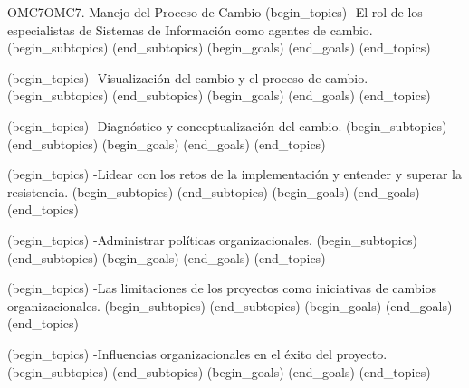 \begin{BKL2}{OMC7}{OMC7. Manejo del Proceso de Cambio}
(begin_topics)
-El rol de los especialistas de Sistemas de Información como agentes de cambio.
(begin_subtopics)
(end_subtopics)
(begin_goals)
(end_goals)
(end_topics)

(begin_topics)
-Visualización del cambio y el proceso de cambio.
(begin_subtopics)
(end_subtopics)
(begin_goals)
(end_goals)
(end_topics)

(begin_topics)
-Diagnóstico y conceptualización del cambio.
(begin_subtopics)
(end_subtopics)
(begin_goals)
(end_goals)
(end_topics)

(begin_topics)
-Lidear con los retos de la implementación y entender y superar la resistencia.
(begin_subtopics)
(end_subtopics)
(begin_goals)
(end_goals)
(end_topics)

(begin_topics)
-Administrar políticas organizacionales.
(begin_subtopics)
(end_subtopics)
(begin_goals)
(end_goals)
(end_topics)

(begin_topics)
-Las limitaciones de los proyectos como iniciativas de cambios organizacionales.
(begin_subtopics)
(end_subtopics)
(begin_goals)
(end_goals)
(end_topics)

(begin_topics)
-Influencias organizacionales en el éxito del proyecto.
(begin_subtopics)
(end_subtopics)
(begin_goals)
(end_goals)
(end_topics)

\end{BKL2}



